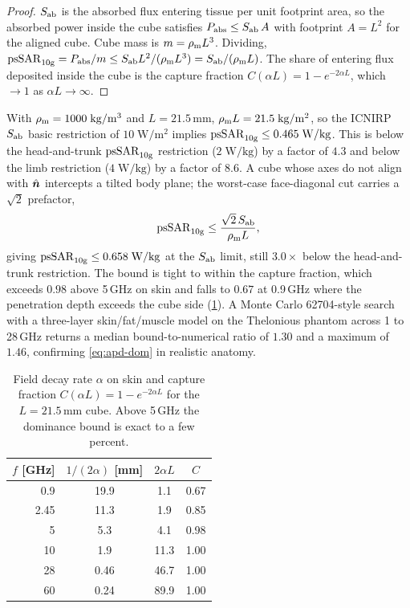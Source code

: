 \begin{proof}
$S_{\mathrm{ab}}$ is the absorbed flux entering tissue per unit footprint area, so the
absorbed power inside the cube satisfies
$P_{\mathrm{abs}} \le S_{\mathrm{ab}}\,A$ with footprint $A = L^2$ for the aligned cube.
Cube mass is $m = \rho_{\mathrm{m}} L^3$. Dividing,
$\mathrm{psSAR}_{10\mathrm{g}} = P_{\mathrm{abs}}/m \le S_{\mathrm{ab}} L^2/(\rho_{\mathrm{m}} L^3) = S_{\mathrm{ab}}/(\rho_{\mathrm{m}} L)$. The
share of entering flux deposited inside the cube is the capture fraction
$C(\alpha L) = 1 - e^{-2\alpha L}$, which $\to 1$ as $\alpha L\to\infty$.
\end{proof}

With $\rho_{\mathrm{m}} = 1000\;\mathrm{kg/m^3}$ and $L = 21.5$\,mm,
$\rho_{\mathrm{m}} L = 21.5\;\mathrm{kg/m^2}$, so the ICNIRP $S_{\mathrm{ab}}$ basic restriction of
$10\;\mathrm{W/m^2}$ implies $\mathrm{psSAR}_{10\mathrm{g}} \le 0.465\;\mathrm{W/kg}$. This is below
the head-and-trunk $\mathrm{psSAR}_{10\mathrm{g}}$ restriction ($2\;\mathrm{W/kg}$) by a factor of
$4.3$ and below the limb restriction ($4\;\mathrm{W/kg}$) by a factor of $8.6$.
A cube whose axes do not align with $\hat{\bm{n}}$ intercepts a tilted body plane; the
worst-case face-diagonal cut carries a $\sqrt{2}$ prefactor,
\begin{equation}\label{eq:apd-dom-gen}
  \mathrm{psSAR}_{10\mathrm{g}} \le \frac{\sqrt{2}\,S_{\mathrm{ab}}}{\rho_{\mathrm{m}} L},
\end{equation}
giving $\mathrm{psSAR}_{10\mathrm{g}} \le 0.658\;\mathrm{W/kg}$ at the $S_{\mathrm{ab}}$ limit, still $3.0\times$
below the head-and-trunk restriction. The bound is tight to within the capture
fraction, which exceeds $0.98$ above 5\,GHz on skin and falls to $0.67$ at
0.9\,GHz where the penetration depth exceeds the cube side
(\cref{tab:pssar-capture}). A Monte Carlo 62704-style search with a three-layer
skin/fat/muscle model on the Thelonious phantom across 1 to 28\,GHz returns a
median bound-to-numerical ratio of $1.30$ and a maximum of $1.46$, confirming
\cref{eq:apd-dom} in realistic anatomy.

\begin{table}[ht]
\centering
\caption{Field decay rate $\alpha$ on skin and capture fraction
$C(\alpha L) = 1 - e^{-2\alpha L}$ for the $L = 21.5$\,mm cube. Above 5\,GHz the
dominance bound is exact to a few percent.}
\label{tab:pssar-capture}
\begin{tabular}{@{}rccc@{}}
\toprule
$f$ [GHz] & $1/(2\alpha)$ [mm] & $2\alpha L$ & $C$ \\
\midrule
0.9  & 19.9 & 1.1  & 0.67 \\
2.45 & 11.3 & 1.9  & 0.85 \\
5    &  5.3 & 4.1  & 0.98 \\
10   &  1.9 & 11.3 & 1.00 \\
28   & 0.46 & 46.7 & 1.00 \\
60   & 0.24 & 89.9 & 1.00 \\
\bottomrule
\end{tabular}
\end{table}

